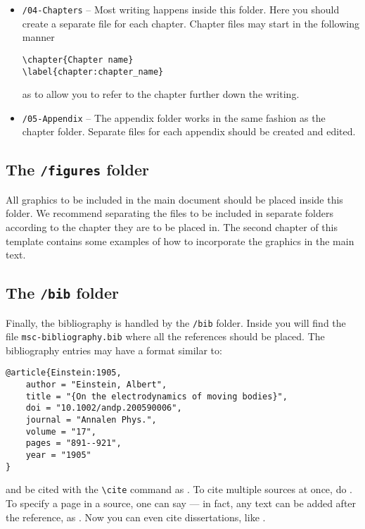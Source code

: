 \begin{itemize}
\item \texttt{/04-Chapters} -- Most writing happens inside this folder. Here you should create a separate file for each chapter. Chapter files may start in the following manner

\begin{verbatim}
\chapter{Chapter name}
\label{chapter:chapter_name}
\end{verbatim}


\noindent as to allow you to refer to the chapter further down the writing.

\item \texttt{/05-Appendix} -- The appendix folder works in the same fashion as the chapter folder. Separate files for each appendix should be created and edited.
\end{itemize}

\subsection{The {\normalfont\texttt{/figures}} folder} %
%
All graphics to be included in the main document should be placed inside this folder. We recommend separating the files to be included in separate folders according to the chapter they are to be placed in. The second chapter of this template contains some examples of how to incorporate the graphics in the main text.

\subsection{The {\normalfont\texttt{/bib}} folder} %

Finally, the bibliography is handled by the \texttt{/bib} folder. Inside you will find the file \texttt{msc-bibliography.bib} where all the references should be placed. The bibliography entries may have a format similar to:

\begin{verbatim}
@article{Einstein:1905,
	author = "Einstein, Albert",
	title = "{On the electrodynamics of moving bodies}",
	doi = "10.1002/andp.200590006",
	journal = "Annalen Phys.",
	volume = "17",
	pages = "891--921",
	year = "1905"
}
\end{verbatim}
%
and be cited with the \verb|\cite| command as \cite{Einstein:1905}. To cite multiple sources at once, do \cite{Mertig:1990:feyncalc,Shtabovenko:2016:feyncalc,Shtabovenko:2020:feyncalc}. To specify a page in a source, one can say \cite[p.~500]{Dokshitzer:1991} --- in fact, any text can be added after the reference, as \cite[Any text you might want]{Peskin:1995}. Now you can even cite dissertations, like \cite{Feynman:1942}.

